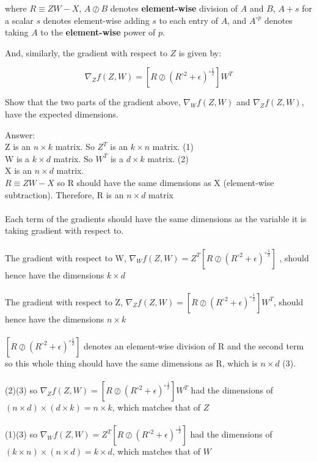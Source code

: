 \documentclass{article}
\newcommand{\blu}[1]{{\textcolor{blu}{#1}}}
\newcommand{\gre}[1]{\textcolor{gre}{#1}}
\newcommand\ans[1]{\par\gre{Answer: #1}}
\let\ask\blu
\begin{document}
where $R\equiv ZW-X$,
$A \oslash B$ denotes \textbf{element-wise} division of $A$ and $B$,
$A + s$ for a scalar $s$ denotes element-wise adding $s$ to each entry of $A$,
and $A^{\circ p}$ denotes taking $A$ to the \textbf{element-wise} power of $p$.

And, similarly, the gradient with respect to $Z$ is given by:

\[
\nabla_Z f(Z,W) = \left[ R \oslash \left(R^{\circ 2} + \epsilon\right)^{\circ \frac12} \right] W^T
\]

\ask{Show that the two parts of the gradient above, $\nabla_W f(Z,W)$ and $\nabla_Z f(Z,W)$, have the expected dimensions.}
\ans{\\
Z is an $n\times k$ matrix. So $Z^T$ is an $k\times n$ matrix. (1)\\ 
W is a $k \times d$ matrix. So $W^T$ is a $d \times k$ matrix. (2)\\
X is an $n \times d$ matrix.\\
$R\equiv ZW-X$ so R should have the same dimensions as X (element-wise subtraction). Therefore, R is an $n \times d$ matrix
\\\\
Each term of the gradients should have the same dimensions as the variable it is taking gradient with respect to. 
\\\\
The gradient with respect to W, 
$\nabla_W f(Z,W) = Z^T \left[ R \oslash \left(R^{\circ 2} + \epsilon\right)^{\circ \frac12}  \right]$
, should hence have the dimensions $k\times d$
\\\\
The gradient with respect to Z, $\nabla_Z f(Z,W) = \left[ R \oslash \left(R^{\circ 2} + \epsilon\right)^{\circ \frac12} \right] W^T$, should hence have the dimensions $n\times k$
\\\\
$\left[ R \oslash \left(R^{\circ 2} + \epsilon\right)^{\circ \frac12} \right]$ denotes an element-wise division of R and the second term so this whole thing should have the same dimensions as R, which is $n \times d$ (3).
\\\\ 
(2)(3) so 
$\nabla_Z f(Z,W) = \left[ R \oslash \left(R^{\circ 2} + \epsilon\right)^{\circ \frac12} \right] W^T$ had the dimensions of $(n \times d) \times (d \times k) = n \times k$, which matches that of $Z$
\\\\
(1)(3) so
$\nabla_W f(Z,W) = Z^T \left[ R \oslash \left(R^{\circ 2} + \epsilon\right)^{\circ \frac12}  \right]$ had the dimensions of $(k \times n) \times (n \times d) = k \times d$, which matches that of $W$
}
\end{document}
